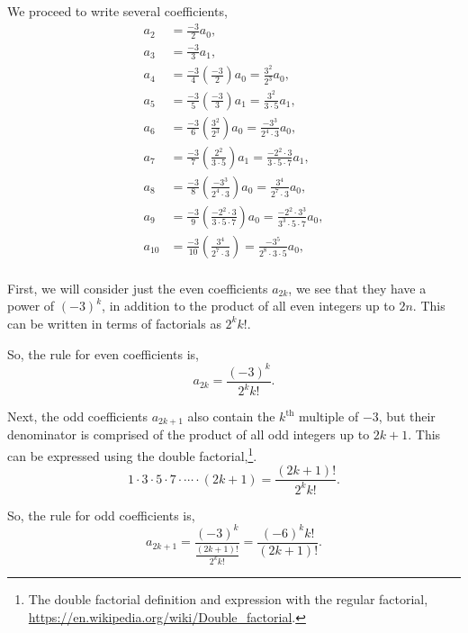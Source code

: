 \documentclass[../hw8]{subfiles}
\begin{document}
We proceed to write several coefficients,
\begin{align*}
    a_2 &= \frac{-3}{2}a_0,\\
    a_3 &= \frac{-3}{3}a_1,\\
    a_4 &= \frac{-3}{4}\left( \frac{-3}{2} \right)a_0=\frac{3^2}{2^3}a_0, \\
    a_5 &= \frac{-3}{5}\left( \frac{-3}{3} \right)a_1=\frac{3^2}{3\cdot5}a_1,\\
    a_6 &= \frac{-3}{6}\left( \frac{3^2}{2^3} \right)a_0=\frac{-3^3}{2^4\cdot3}a_0,\\
    a_7 &= \frac{-3}{7}\left( \frac{2^2}{3\cdot5} \right)a_1=\frac{-2^2\cdot3}{3\cdot5\cdot7}a_1,\\
    a_8 &= \frac{-3}{8}\left( \frac{-3^3}{2^4\cdot3} \right)a_0=\frac{3^4}{2^7\cdot3}a_0,\\
    a_9 &= \frac{-3}{9}\left( \frac{-2^2\cdot3}{3\cdot5\cdot7} \right)a_0=\frac{-2^2\cdot3^3}{3^3\cdot5\cdot7}a_0,\\
    a_{10} &= \frac{-3}{10}\left( \frac{3^4}{2^7\cdot3} \right)=\frac{-3^5}{2^8\cdot3\cdot5}a_0,\\
\end{align*}

First, we will consider just the even coefficients $a_{2k}$, we see that they have a power of ${(-3)}^k$, in addition to the product of all even integers up to $2n$. This can be written in terms of factorials as $2^k k{!}$.

So, the rule for even coefficients is, \[a_{2k}=\frac{{(-3)}^k}{2^k k!}.\]

Next, the odd coefficients $a_{2k+1}$ also contain the $k^{\text{th}}$ multiple of $-3$, but their denominator is comprised of the product of all odd integers up to $2k+1$. This can be expressed using the double factorial,\footnote{The double factorial definition and expression with the regular factorial, \url{https://en.wikipedia.org/wiki/Double_factorial}.}.
\[1\cdot3\cdot5\cdot7\cdot\cdots\cdot(2k+1)=\frac{(2k+1)!}{2^k k!}.\]

So, the rule for odd coefficients is, \[a_{2k+1}=\frac{{(-3)}^k}{\frac{(2k+1)!}{2^k k!}}=\frac{{(-6)}^k k!}{(2k+1)!}.\]
\end{document}
